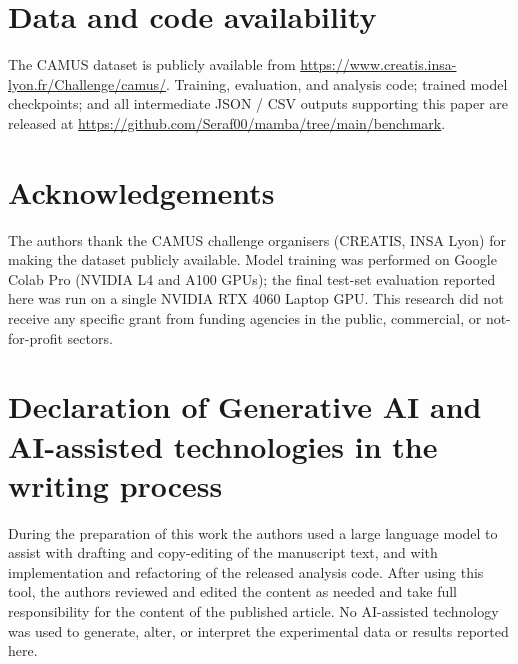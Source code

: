 \documentclass[review,1p,times]{elsarticle}
\begin{document}








\section*{Data and code availability}
The CAMUS dataset is publicly available from
\url{https://www.creatis.insa-lyon.fr/Challenge/camus/}. Training,
evaluation, and analysis code; trained model checkpoints; and all
intermediate JSON / CSV outputs supporting this paper are released at
\url{https://github.com/Seraf00/mamba/tree/main/benchmark}.

\section*{Acknowledgements}
The authors thank the CAMUS challenge organisers (CREATIS, INSA Lyon) for
making the dataset publicly available. Model training was performed on
Google Colab Pro (NVIDIA L4 and A100 GPUs); the final test-set evaluation
reported here was run on a single NVIDIA RTX 4060 Laptop GPU.
This research did not receive any specific grant from funding agencies in
the public, commercial, or not-for-profit sectors.

\section*{Declaration of Generative AI and AI-assisted technologies in the
writing process}
During the preparation of this work the authors used a large language model
to assist with drafting and copy-editing of the manuscript text, and with
implementation and refactoring of the released analysis code. After using
this tool, the authors reviewed and edited the content as needed and take
full responsibility for the content of the published article. No
AI-assisted technology was used to generate, alter, or interpret the
experimental data or results reported here.


\end{document}
